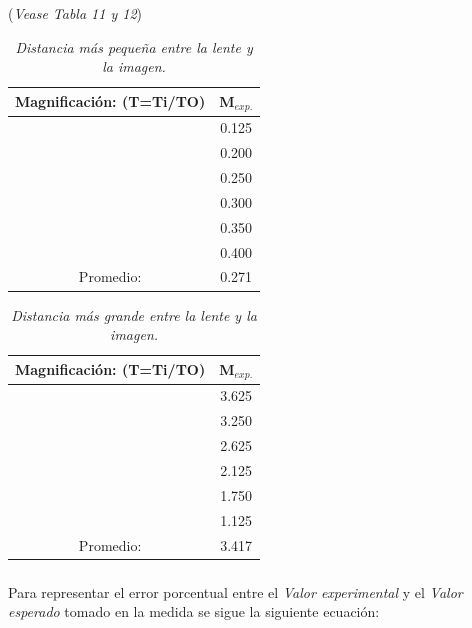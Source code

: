 \documentclass{article}
\begin{document}
\subsubsection{}
(\emph{Vease Tabla 11 y 12})
\begin{table}[h!]
\begin{center}
\begin{tabular}{ |c|c| } 
 \hline
 Magnificación: (T=Ti/TO) & M$_{exp.}$ \\ 
 \hline
 & 0.125 	    \\ 
 & 0.200  	 	\\ 
 & 0.250  	 	\\
 & 0.300  	 	\\
 & 0.350  	 	\\
 & 0.400  	 	\\
 \hline
  Promedio: & 0.271  \\

 \hline
\end{tabular}
\caption{ \emph{Distancia más pequeña entre la lente y la imagen.}}
\label{table:1}
\end{center}
\end{table}

\begin{table}[h!]
\begin{center}
\begin{tabular}{ |c|c| } 
 \hline
 Magnificación: (T=Ti/TO) & M$_{exp.}$ \\ 
 \hline
 & 3.625 	    \\ 
 & 3.250  	 	\\ 
 & 2.625  	 	\\
 & 2.125  	 	\\
 & 1.750  	 	\\
 & 1.125  	 	\\
 \hline
  Promedio: & 3.417  \\

 \hline
\end{tabular}
\caption{ \emph{Distancia más grande entre la lente y la imagen.}}
\label{table:1}
\end{center}
\end{table}

\subsubsection{}
Para representar el error porcentual entre el \emph{Valor experimental} y el \emph{Valor esperado} tomado en la medida se sigue la siguiente ecuación:
\end{document}
